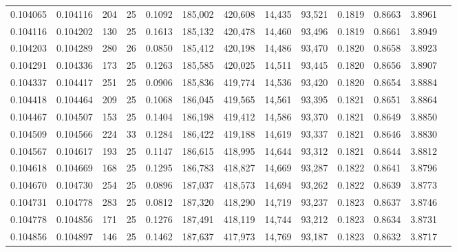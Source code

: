\begin{tabular}{rrrrrrrrrrrrr}
0.104065 & 0.104116 & 204 &  25 &                                     0.1092 & 185,002 & 420,608 &  14,435 &  93,521 & 0.1819 & 0.8663 & 3.8961 \\
0.104116 & 0.104202 & 130 &  25 &                                     0.1613 & 185,132 & 420,478 &  14,460 &  93,496 & 0.1819 & 0.8661 & 3.8949 \\
0.104203 & 0.104289 & 280 &  26 &                                     0.0850 & 185,412 & 420,198 &  14,486 &  93,470 & 0.1820 & 0.8658 & 3.8923 \\
0.104291 & 0.104336 & 173 &  25 &                                     0.1263 & 185,585 & 420,025 &  14,511 &  93,445 & 0.1820 & 0.8656 & 3.8907 \\
0.104337 & 0.104417 & 251 &  25 &                                     0.0906 & 185,836 & 419,774 &  14,536 &  93,420 & 0.1820 & 0.8654 & 3.8884 \\
0.104418 & 0.104464 & 209 &  25 &                                     0.1068 & 186,045 & 419,565 &  14,561 &  93,395 & 0.1821 & 0.8651 & 3.8864 \\
0.104467 & 0.104507 & 153 &  25 &                                     0.1404 & 186,198 & 419,412 &  14,586 &  93,370 & 0.1821 & 0.8649 & 3.8850 \\
0.104509 & 0.104566 & 224 &  33 &                                     0.1284 & 186,422 & 419,188 &  14,619 &  93,337 & 0.1821 & 0.8646 & 3.8830 \\
0.104567 & 0.104617 & 193 &  25 &                                     0.1147 & 186,615 & 418,995 &  14,644 &  93,312 & 0.1821 & 0.8644 & 3.8812 \\
0.104618 & 0.104669 & 168 &  25 &                                     0.1295 & 186,783 & 418,827 &  14,669 &  93,287 & 0.1822 & 0.8641 & 3.8796 \\
0.104670 & 0.104730 & 254 &  25 &                                     0.0896 & 187,037 & 418,573 &  14,694 &  93,262 & 0.1822 & 0.8639 & 3.8773 \\
0.104731 & 0.104778 & 283 &  25 &                                     0.0812 & 187,320 & 418,290 &  14,719 &  93,237 & 0.1823 & 0.8637 & 3.8746 \\
0.104778 & 0.104856 & 171 &  25 &                                     0.1276 & 187,491 & 418,119 &  14,744 &  93,212 & 0.1823 & 0.8634 & 3.8731 \\
0.104856 & 0.104897 & 146 &  25 &                                     0.1462 & 187,637 & 417,973 &  14,769 &  93,187 & 0.1823 & 0.8632 & 3.8717 \\

\end{tabular}
